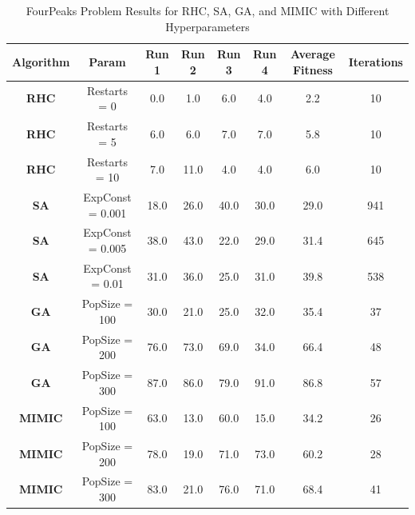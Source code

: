 \begin{table}[h!]
    \centering
    \caption{FourPeaks Problem Results for RHC, SA, GA, and MIMIC with Different Hyperparameters}
    \begin{tabular}{|c|c|c|c|c|c|c|c|}
        \hline
        \textbf{Algorithm} & \textbf{Param} & \textbf{Run 1} & \textbf{Run 2} & \textbf{Run 3} & \textbf{Run 4} & \textbf{Average Fitness} & \textbf{Iterations} \\ \hline
        
        \textbf{RHC} & Restarts = 0 & 0.0 & 1.0 & 6.0 & 4.0 & 2.2 & 10 \\ \hline
        \textbf{RHC} & Restarts = 5 & 6.0 & 6.0 & 7.0 & 7.0 & 5.8 & 10 \\ \hline
        \textbf{RHC} & Restarts = 10 & 7.0 & 11.0 & 4.0 & 4.0 & 6.0 & 10 \\ \hline
        
        \textbf{SA} & ExpConst = 0.001 & 18.0 & 26.0 & 40.0 & 30.0 & 29.0 & 941 \\ \hline
        \textbf{SA} & ExpConst = 0.005 & 38.0 & 43.0 & 22.0 & 29.0 & 31.4 & 645 \\ \hline
        \textbf{SA} & ExpConst = 0.01 & 31.0 & 36.0 & 25.0 & 31.0 & 39.8 & 538 \\ \hline
        
        \textbf{GA} & PopSize = 100 & 30.0 & 21.0 & 25.0 & 32.0 & 35.4 & 37 \\ \hline
        \textbf{GA} & PopSize = 200 & 76.0 & 73.0 & 69.0 & 34.0 & 66.4 & 48 \\ \hline
        \textbf{GA} & PopSize = 300 & 87.0 & 86.0 & 79.0 & 91.0 & 86.8 & 57 \\ \hline
        
        \textbf{MIMIC} & PopSize = 100 & 63.0 & 13.0 & 60.0 & 15.0 & 34.2 & 26 \\ \hline
        \textbf{MIMIC} & PopSize = 200 & 78.0 & 19.0 & 71.0 & 73.0 & 60.2 & 28 \\ \hline
        \textbf{MIMIC} & PopSize = 300 & 83.0 & 21.0 & 76.0 & 71.0 & 68.4 & 41 \\ \hline
        
    \end{tabular}
    \label{tab:fourpeaks_results}
\end{table}
